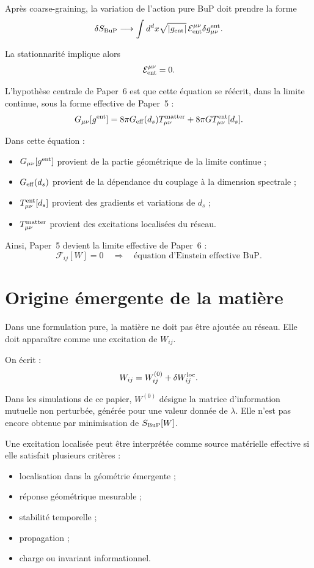 \documentclass[11pt,a4paper]{article}
\begin{document}
Après coarse-graining, la variation de l'action pure BuP doit prendre la forme
\[
\delta S_{\rm BuP}
\longrightarrow
\int d^dx\sqrt{|g_{\rm ent}|}
\,
\mathcal{E}^{\mu\nu}_{\rm ent}
\delta g_{\mu\nu}^{\rm ent}.
\]

La stationnarité implique alors
\[
\mathcal{E}^{\mu\nu}_{\rm ent}=0.
\]

L'hypothèse centrale de Paper~6 est que cette équation se réécrit, dans la limite continue, sous la forme effective de Paper~5 :
\[
G_{\mu\nu}[g^{\rm ent}]
=
8\pi G_{\rm eff}(d_s)T_{\mu\nu}^{\rm matter}
+
8\pi G T_{\mu\nu}^{\rm ent}[d_s].
\]

Dans cette équation :
\begin{itemize}
  \item \(G_{\mu\nu}[g^{\rm ent}]\) provient de la partie géométrique de la limite continue ;
  \item \(G_{\rm eff}(d_s)\) provient de la dépendance du couplage à la dimension spectrale ;
  \item \(T_{\mu\nu}^{\rm ent}[d_s]\) provient des gradients et variations de \(d_s\) ;
  \item \(T_{\mu\nu}^{\rm matter}\) provient des excitations localisées du réseau.
\end{itemize}

Ainsi, Paper~5 devient la limite effective de Paper~6 :
\[
\boxed{
\mathcal{F}_{ij}[W]=0
\quad\Longrightarrow\quad
\text{équation d'Einstein effective BuP}.
}
\]

\section{Origine émergente de la matière}
\label{sec:matter}

Dans une formulation pure, la matière ne doit pas être ajoutée au réseau. Elle doit apparaître comme une excitation de \(W_{ij}\).

On écrit :
\[
W_{ij}
=
W_{ij}^{(0)}
+
\delta W_{ij}^{\rm loc}.
\]

Dans les simulations de ce papier, \(W^{(0)}\) désigne la matrice d'information mutuelle non perturbée, générée pour une valeur donnée de \(\lambda\). Elle n'est pas encore obtenue par minimisation de \(S_{\rm BuP}[W]\).

Une excitation localisée peut être interprétée comme source matérielle effective si elle satisfait plusieurs critères :
\begin{itemize}
  \item localisation dans la géométrie émergente ;
  \item réponse géométrique mesurable ;
  \item stabilité temporelle ;
  \item propagation ;
  \item charge ou invariant informationnel.
\end{itemize}
\end{document}
